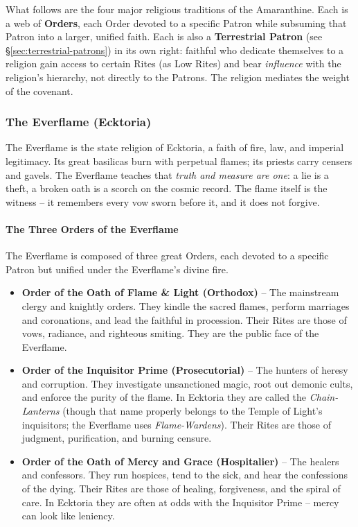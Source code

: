 What follows are the four major religious traditions of the Amaranthine. Each is a web of \textbf{Orders}, each Order devoted to a specific Patron while subsuming that Patron into a larger, unified faith. Each is also a \textbf{Terrestrial Patron} (see \S\ref{sec:terrestrial-patrons}) in its own right: faithful who dedicate themselves to a religion gain access to certain Rites (as Low Rites) and bear \textit{influence} with the religion's hierarchy, not directly to the Patrons. The religion mediates the weight of the covenant.

\subsubsection{The Everflame (Ecktoria)}
\label{sec:everflame}

The Everflame is the state religion of Ecktoria, a faith of fire, law, and imperial legitimacy. Its great basilicas burn with perpetual flames; its priests carry censers and gavels. The Everflame teaches that \textit{truth and measure are one}: a lie is a theft, a broken oath is a scorch on the cosmic record. The flame itself is the witness -- it remembers every vow sworn before it, and it does not forgive.

\paragraph{The Three Orders of the Everflame}
The Everflame is composed of three great Orders, each devoted to a specific Patron but unified under the Everflame's divine fire.

\begin{itemize}
  \item \textbf{Order of the Oath of Flame \& Light (Orthodox)} -- The mainstream clergy and knightly orders. They kindle the sacred flames, perform marriages and coronations, and lead the faithful in procession. Their Rites are those of vows, radiance, and righteous smiting. They are the public face of the Everflame.
  \item \textbf{Order of the Inquisitor Prime (Prosecutorial)} -- The hunters of heresy and corruption. They investigate unsanctioned magic, root out demonic cults, and enforce the purity of the flame. In Ecktoria they are called the \textit{Chain-Lanterns} (though that name properly belongs to the Temple of Light's inquisitors; the Everflame uses \textit{Flame-Wardens}). Their Rites are those of judgment, purification, and burning censure.
  \item \textbf{Order of the Oath of Mercy and Grace (Hospitalier)} -- The healers and confessors. They run hospices, tend to the sick, and hear the confessions of the dying. Their Rites are those of healing, forgiveness, and the spiral of care. In Ecktoria they are often at odds with the Inquisitor Prime -- mercy can look like leniency.
\end{itemize}

